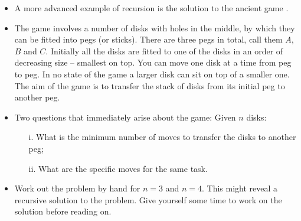 \documentclass[a4paper]{article}
\begin{document}
{\begin{itemize}
\begin{uexercise}
\begin{enumerate}
\begin{hide}
\begin{usolution}
\begin{ucodeframe}
\end{ucodeframe}
\end{usolution}
\end{hide}

\item Write Python code implementing the recursive algorithm.
\begin{hide}
\begin{usolution}
\begin{ucodeframe}
\end{ucodeframe}
\end{usolution}
\end{hide}
\end{enumerate}
\end{uexercise}


\item A more advanced example of recursion is the solution to the ancient
game \href{https://en.wikipedia.org/wiki/Tower_of_Hanoi}{}.

\item The game involves a number of disks with holes in the middle, by which
they can be fitted into pegs (or sticks). There are three pegs in total, call
them $A$, $B$ and $C$. Initially all the disks are fitted to one of the disks in
an order of decreasing size -- smallest on top. You can move one disk at a time
from peg to peg. In no state of the game a larger disk can sit on top of a
smaller one. The aim of the game is to transfer the stack of disks from its
initial peg to another peg.

\item Two questions that immediately arise about the game: Given $n$ disks:
	\begin{itemize}
	\item[i.] What is the minimum number of moves to transfer the disks to
	another peg;
	\item[ii.] What are the specific moves for the same task. 
	\end{itemize}

\item Work out the problem by hand for $n=3$ and $n=4$. This might reveal a recursive
solution to the problem. Give yourself some time to work on the solution before
reading on.


\end{itemize}}
\end{document}
